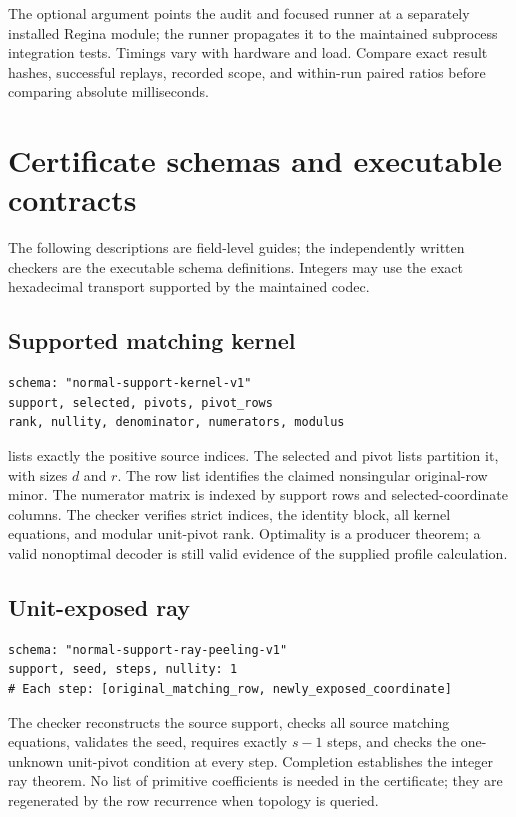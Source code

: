The optional  argument points the audit and focused runner
at a separately installed Regina module; the runner propagates it to the
maintained subprocess integration tests.  Timings vary with hardware and
load.  Compare exact result hashes, successful replays, recorded scope, and
within-run paired ratios before comparing absolute milliseconds.

\section{Certificate schemas and executable contracts}
\label{sec:schemas}

The following descriptions are field-level guides; the independently written
checkers are the executable schema definitions.  Integers may use the exact
hexadecimal transport supported by the maintained codec.

\subsection{Supported matching kernel}
\begin{lstlisting}
schema: "normal-support-kernel-v1"
support, selected, pivots, pivot_rows
rank, nullity, denominator, numerators, modulus
\end{lstlisting}
 lists exactly the positive source indices.  The selected and
pivot lists partition it, with sizes $d$ and $r$.  The row list identifies the
claimed nonsingular original-row minor.  The numerator matrix is indexed by
support rows and selected-coordinate columns.  The checker verifies strict
indices, the identity block, all kernel equations, and modular unit-pivot
rank.  Optimality is a producer theorem; a valid nonoptimal decoder is still
valid evidence of the supplied profile calculation.

\subsection{Unit-exposed ray}
\begin{lstlisting}
schema: "normal-support-ray-peeling-v1"
support, seed, steps, nullity: 1
# Each step: [original_matching_row, newly_exposed_coordinate]
\end{lstlisting}
The checker reconstructs the source support, checks all source matching
equations, validates the seed, requires exactly $s-1$ steps, and checks the
one-unknown unit-pivot condition at every step.  Completion establishes the
integer ray theorem.  No list of primitive coefficients is needed in the
certificate; they are regenerated by the row recurrence when topology is
queried.

